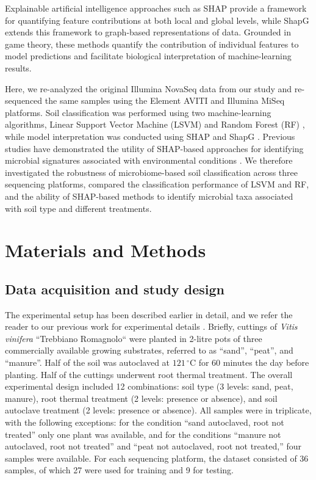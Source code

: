 \documentclass[12pt]{article}
\theoremstyle{thmstyleone}%
\theoremstyle{thmstyletwo}%
\theoremstyle{thmstylethree}%
\begin{document}
Explainable artificial intelligence approaches such as SHAP \citep{SHAP} provide a framework for quantifying feature contributions at both local and global levels, while ShapG \citep{shapG} extends this framework to graph-based representations of data. Grounded in game theory, these methods quantify the contribution of individual features to model predictions and facilitate biological interpretation of machine-learning results. 

Here, we re-analyzed the original Illumina NovaSeq data from our study and re-sequenced the same samples using the Element AVITI and Illumina MiSeq platforms. Soil classification was performed using two machine-learning algorithms, Linear Support Vector Machine (LSVM) \citep{SVM} and Random Forest (RF) \citep{RandomForest}, while model interpretation was conducted using SHAP \citep{SHAP} and ShapG \citep{shapG}. Previous studies have demonstrated the utility of SHAP-based approaches for identifying microbial signatures associated with environmental conditions \citep{Hagen2024}. We therefore investigated the robustness of microbiome-based soil classification across three sequencing platforms, compared the classification performance of LSVM and RF, and the ability of SHAP-based methods to identify microbial taxa associated with soil type and different treatments.


\section{Materials and Methods}
\subsection{Data acquisition and study design}
The experimental setup has been described earlier in detail, and we refer the reader to our previous work for experimental details \citep{guazzini_variations_2026}. Briefly, cuttings of \textit{Vitis vinifera} “Trebbiano Romagnolo“ were planted in 2-litre pots of three commercially available growing substrates, referred to as “sand”, “peat”, and “manure”. Half of the soil was autoclaved at $121\,^{\circ}\text{C}$ for 60 minutes the day before planting. Half of the cuttings underwent root thermal treatment. The overall experimental design included 12 combinations: soil type (3 levels: sand, peat, manure), root thermal treatment (2 levels: presence or absence), and soil autoclave treatment (2 levels: presence or absence). All samples were in triplicate, with the following exceptions: for the condition “sand autoclaved, root not treated” only one plant was available, and for the conditions “manure not autoclaved, root not treated” and “peat not autoclaved, root not treated,” four samples were available. For each sequencing platform, the dataset consisted of 36 samples, of which 27 were used for training and 9 for testing.
\end{document}
